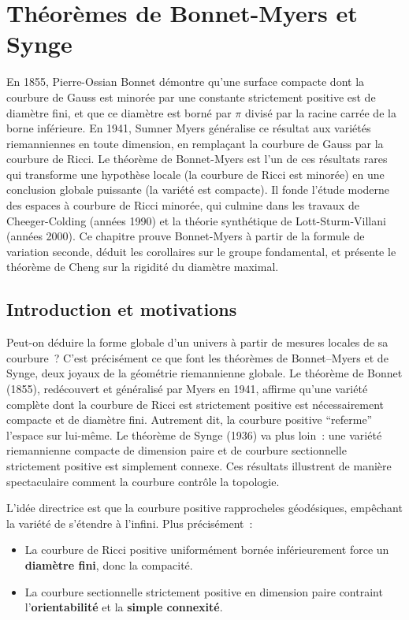 \chapter{Th\'eor\`emes de Bonnet-Myers et Synge}
\label{ch:bonnet_myers}

En 1855, Pierre-Ossian Bonnet démontre qu'une surface compacte dont la courbure de Gauss est minorée par une constante strictement positive est de diamètre fini, et que ce diamètre est borné par $\pi$ divisé par la racine carrée de la borne inférieure. En 1941, Sumner Myers généralise ce résultat aux variétés riemanniennes en toute dimension, en remplaçant la courbure de Gauss par la courbure de Ricci. Le théorème de Bonnet-Myers est l'un de ces résultats rares qui transforme une hypothèse locale (la courbure de Ricci est minorée) en une conclusion globale puissante (la variété est compacte). Il fonde l'étude moderne des espaces à courbure de Ricci minorée, qui culmine dans les travaux de Cheeger-Colding (années 1990) et la théorie synthétique de Lott-Sturm-Villani (années 2000). Ce chapitre prouve Bonnet-Myers à partir de la formule de variation seconde, déduit les corollaires sur le groupe fondamental, et présente le théorème de Cheng sur la rigidité du diamètre maximal.

\section{Introduction et motivations}

Peut-on d\'eduire la forme globale d'un univers \`a partir de mesures locales de sa courbure~? C'est pr\'ecis\'ement ce que font les th\'eor\`emes de Bonnet--Myers et de Synge, deux joyaux de la g\'eom\'etrie riemannienne globale. Le th\'eor\`eme de Bonnet (1855), red\'ecouvert et g\'en\'eralis\'e par Myers en 1941, affirme qu'une vari\'et\'e compl\`ete dont la courbure de Ricci est strictement positive est n\'ecessairement compacte et de diam\`etre fini. Autrement dit, la courbure positive ``referme'' l'espace sur lui-m\^eme. Le th\'eor\`eme de Synge (1936) va plus loin~: une vari\'et\'e riemannienne compacte de dimension paire et de courbure sectionnelle strictement positive est simplement connexe. Ces r\'esultats illustrent de mani\`ere spectaculaire comment la courbure contr\^ole la topologie.

\begin{intuition}
L'id\'ee directrice est que la courbure positive \og{}rapproche\fg les g\'eod\'esiques,
emp\^echant la vari\'et\'e de s'\'etendre \`a l'infini. Plus pr\'ecis\'ement~:
\begin{itemize}
    \item La courbure de Ricci positive uniform\'ement born\'ee inf\'erieurement
          force un \textbf{diam\`etre fini}, donc la compacit\'e.
    \item La courbure sectionnelle strictement positive en dimension paire
          contraint l'\textbf{orientabilit\'e} et la \textbf{simple connexit\'e}.
\end{itemize}
\end{intuition}

